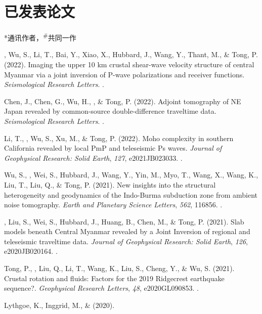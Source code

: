 \section{已发表论文}
\newcommand{\CS}{*} %
\newcommand{\CF}{\textsuperscript{\#}} %

\CS 通讯作者，\CF 共同一作
\begin{etaremune}
\item
    \Yao, Wu, S., Li, T., Bai, Y., Xiao, X., Hubbard, J., Wang, Y., Thant, M., \& Tong, P. (2022).
    Imaging the upper 10 km crustal shear-wave velocity structure of central Myanmar via a joint inversion of P-wave polarizations and receiver functions.
    \textit{Seismological Research Letters}.
	.
\item
    Chen, J., Chen, G., Wu, H., \Yao, \& Tong, P. (2022).
    Adjoint tomography of NE Japan revealed by common-source double-difference traveltime data.
    \textit{Seismological Research Letters}.
    .
\item
    Li, T., \Yao, Wu, S., Xu, M., \& Tong, P. (2022).
    Moho complexity in southern California revealed by local PmP and teleseismic Ps waves.
    \textit{Journal of Geophysical Research: Solid Earth}, \textit{127}, e2021JB023033.
    .
\item
    Wu, S., \Yao, Wei, S., Hubbard, J., Wang, Y., Yin, M., Myo, T., Wang, X., Wang, K., Liu, T., Liu, Q., \& Tong, P. (2021).
    New insights into the structural heterogeneity and geodynamics of the Indo-Burma subduction zone from ambient noise tomography.
    \textit{Earth and Planetary Science Letters}, \textit{562}, 116856.
    .
\item
    \Yao, Liu, S., Wei, S., Hubbard, J., Huang, B., Chen, M., \& Tong, P. (2021).
    Slab models beneath Central Myanmar revealed by a Joint Inversion of regional and teleseismic traveltime data.
    \textit{Journal of Geophysical Research: Solid Earth}, \textit{126}, e2020JB020164.
    .
\item
    Tong, P., \Yao, Liu, Q., Li, T., Wang, K., Liu, S., Cheng, Y., \& Wu, S. (2021).
    Crustal rotation and fluids: Factors for the 2019 Ridgecrest earthquake sequence?.
    \textit{Geophysical Research Letters}, \textit{48}, e2020GL090853.
    .
\item
    Lythgoe, K., Inggrid, M., \& \Yao (2020).

\end{etaremune}

